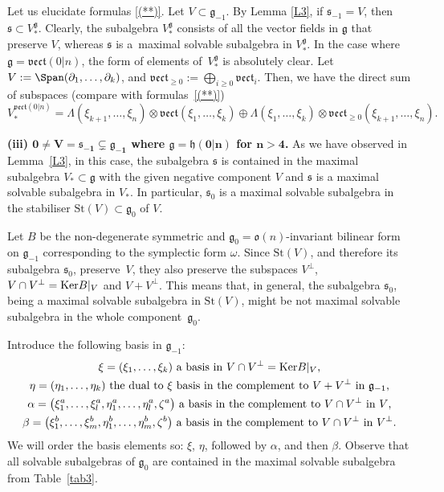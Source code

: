 \documentclass[10pt,a4paper]{amsart}
\newcommand {\fg} {{\mathfrak{g}}} %
\newcommand {\fh} {{\mathfrak{h}}}
\newcommand {\fo} {{\mathfrak{o}}}
\newcommand {\fs} {{\mathfrak{s}}}
\newcommand {\fvect} {{\mathfrak{vect}}} %
\newcommand {\<} [2] {{\left.\vphantom{#2}\right.^{#1\!}\!{#2}}}
\numberwithin{equation}{section}
\begin{document}
Let us elucidate formulas \eqref{(**)}. Let $V\subset \fg_{-1}$.
By Lemma \ref{L3}, if $\fs_{-1}=V$, then $\fs\subset V_*^\fg$.
Clearly, the subalgebra $V_*^\fg$ consists of all the vector fields in $\fg$ that preserve $V$, whereas $\fs$ is a~maximal solvable subalgebra in $V_*^\fg$. In the case where $\fg=\fvect(0|n)$, the form of elements of~$V_*^\fg$ is absolutely clear. Let ${V:=\Span(\partial_1, \dots, \partial_k)}$, and $\fvect_{\geq 0}:=\bigoplus_{i\ge 0} \fvect_i$. Then, we have the direct sum of subspaces (compare with formulas~\eqref{(**)})
\[
V_*^{\fvect(0|n)}= \Lambda(\xi_{k+1},\dots, \xi_n)\otimes \fvect(\xi_1,\dots, \xi_k)\oplus \Lambda(\xi_1,\dots,\xi_k)\otimes \fvect_{\geq 0}(\xi_{k+1},\dots, \xi_n).
\]

{\bf (iii) $\boldsymbol{0\neq V=\fs_{-1}\subsetneq\fg_{-1}}$ where $\boldsymbol{\fg=\fh(0|n)}$ for $\boldsymbol{n>4}$.} As we have observed in Lem\-ma~\ref{L3}, in this case, the subalgebra $\fs$ is contained in the maximal subalgebra $V_*\subset \fg$ with the given negative component $V$ and $\fs$ is a maximal solvable subalgebra in $V_*$. In particular, $\fs_0$ is a maximal solvable subalgebra in the stabiliser $\text{St}(V)\subset \fg_0$ of $V$.

Let $B$ be the non-degenerate symmetric and $\fg_0=\fo(n)$-invariant bilinear form on $\fg_{-1}$ corresponding to the symplectic form $\omega$. Since $\text{St}(V)$, and therefore its subalgebra $\fs_0$, preserve~$V$, they also preserve the subspaces $V^\perp$, $V\cap V^\perp= {\rm{Ker}} B|_V$ and $V+V^\perp$. This means that, in general, the subalgebra $\fs_0$, being a maximal solvable subalgebra in $\text{St}(V)$, might be not maximal solvable subalgebra in the whole component~$\fg_0$.

Introduce the following basis in $\fg_{-1}$:
\begin{gather}
\text{$\xi=(\xi_1, \dots , \xi_k)$ a basis in $V\cap V^\perp={\rm{Ker}} B|_V$,}\nonumber\\
\text{$\eta=(\eta_1, \dots, \eta_k)$ the dual to $\xi$ basis in the complement to $V+V^\perp$ in $\fg_{-1}$,}\nonumber\\
\text{$\alpha=\bigl(\xi_1^a, \dots, \xi_l^a, \eta^a_1,\dots, \eta_l^a, \zeta^a\bigr)$ a basis in the complement to $V\cap V^\perp$ in $V$,}\nonumber\\
\text{$\beta=\bigl(\xi_1^b, \dots, \xi_m^b, \eta^b_1,\dots, \eta_m^b, \zeta^b\bigr)$ a basis in the complement to $V\cap V^\perp$ in $V^\perp$.}\label{klm}
\end{gather}
We will order the basis elements so: $\xi$, $\eta$, followed by $\alpha$, and then $\beta$. Observe that all solvable subalgebras of $\fg_0$ are contained in the maximal solvable subalgebra from Table~\ref{tab3}.
\end{document}
